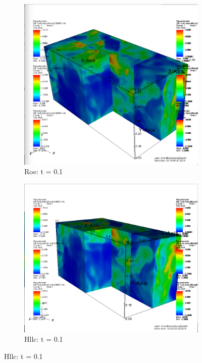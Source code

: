 \documentclass[12pt]{article}
\begin{document}
\begin{figure}[h]
	\centering
	\begin{subfigure}[h]{0.4500\textwidth}
		\centering
		\includegraphics[width=\textwidth]{roet1.png}
		\caption{Roe: t = 0.1}
	\end{subfigure}
	\begin{subfigure}[h]{0.4500\textwidth}
		\centering
		\includegraphics[width=\textwidth]{hllct1.png}
		\caption{Hllc: t = 0.1}
	\end{subfigure}
\end{figure}\\\\
\end{document}
